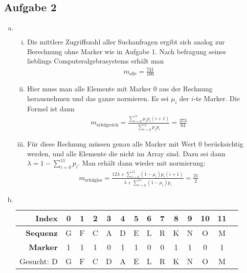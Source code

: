 \documentclass[11pt]{article}
\begin{document}
\newpage
\subsection*{Aufgabe 2}
\begin{enumerate}[a)]
  \item  $ $
    \begin{enumerate}[i)]
      \item Die mittlere Zugriffszahl aller Suchanfragen ergibt sich analog
        zur Berechnung ohne Marker wie in Aufgabe 1. Nach befragung seines
        lieblings Computeralgebrasystems erh\"alt man
        \begin{align*}
          m_\text{alle} = \frac{741}{100}
        \end{align*}
      \item Hier muss man alle Elemente mit Marker 0 aus der Rechnung 
        herausnehmen und das ganze normieren. 
        Es sei $\mu_i$ der $i$-te Marker. Die Formel ist dann
        \begin{align*}
          m_\text{erfolgreich} = \frac{\sum_{i=0}^{11} \mu_i p_i (i+1)}{
          \sum_{i=0}^{11} \mu_i p_i} = \frac{373}{64}
        \end{align*}
      \item F\"ur diese Rechnung m\"ussen genau alle Marker mit Wert 0
        ber\"ucksichtig werden, und alle Elemente die nicht im Array sind.
        Dazu sei dann $\lambda = 1 - \sum_{i=0}^{11} p_i$.
        Man erh\"alt dann wieder mit normierung:
        \begin{align*}
          m_\text{erfolglos} = \frac{12 \lambda + \sum_{i=0}^{11} (1-\mu_i) p_i (i+1) }{
          \lambda + \sum_{i=0}^{11} (1-\mu_i) p_i } = \frac{21}{2}
        \end{align*}
    \end{enumerate} 
\newpage
  \item $ $
    \begin{table}[h!]
      \centering
      \begin{tabular}{r | c c c c c c c c c c c c c}
        \hline\hline
        \textbf{Index} & 0 & 1 & 2 & 3 & 4 & 5 & 6 & 7 & 8 & 9 & 10 & 11 \\
        \hline
        \textbf{Sequenz} & G & F & C & A & D & E & L & R & K & N & O & M \\
        \textbf{Marker} & 1 & 1 & 1 & 0 & 1 & 1 & 0 & 0 & 1 & 1 & 0 & 1 \\
        \hline
        Gesucht: D  & G & F & C & D & A & E & L & R & K & N & O & M \\

\end{tabular}
\end{table}
\end{enumerate}
\end{document}
